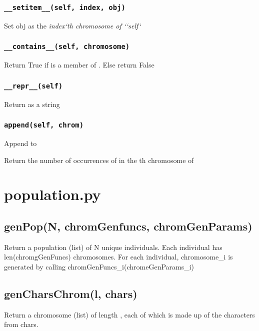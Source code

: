 \documentclass[letterpaper,10pt,english]{sphinxmanual}
\begin{document}
\subsection{\texttt{\_\_setitem\_\_(self, index, obj)}}
\label{individual.py:setitem-self-index-obj}
Set obj as the \emph{index{}`th chromosome of {}`{}`self{}`}


\subsection{\texttt{\_\_contains\_\_(self, chromosome)}}
\label{individual.py:contains-self-chromosome}
Return True if  is a member of .
Else return False


\subsection{\texttt{\_\_repr\_\_(self)}}
\label{individual.py:repr-self}
Return  as a string


\subsection{\texttt{append(self, chrom)}}
\label{individual.py:append-self-chrom}
Append  to 

Return the number of occurrences of  in the  th chromosome of 


\chapter{population.py}
\label{population.py::doc}\label{population.py:population-py}

\section{genPop(N, chromGenfuncs, chromGenParams)}
\label{population.py:genpop-n-chromgenfuncs-chromgenparams}
Return a population (list) of N unique individuals.
Each individual has len(chromgGenFuncs) chromosomes.
For each individual, chromosome\_i is generated by calling chromGenFuncs\_i(chromeGenParams\_i)


\section{genCharsChrom(l, chars)}
\label{population.py:gencharschrom-l-chars}
Return a chromosome (list) of length , each of which is made up of the characters from chars.
\end{document}
